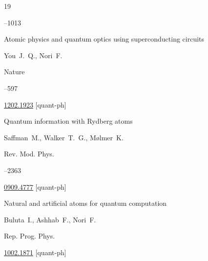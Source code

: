 \begin{thebibliography}{19}



--1013





\paper Atomic physics and quantum optics using superconducting circuits

\by  You~J.~Q., Nori~F.

\jour Nature




--597


\arxiv \href{http://arxiv.org/abs/1202.1923}{1202.1923} [quant-ph]








\paper  Quantum information with Rydberg atoms 

\by  Saffman~M., Walker~T.~G.,  M{\o}lmer~K.

\jour Rev. Mod. Phys.




--2363


\arxiv \href{http://arxiv.org/abs/0909.4777}{0909.4777} [quant-ph]




\paper Natural and artificial atoms for quantum computation

\by Buluta~I., Ashhab~F., Nori~F.

\jour Rep. Prog. Phys.






\arxiv \href{http://arxiv.org/abs/1002.1871}{1002.1871} [quant-ph]






\end{thebibliography}

